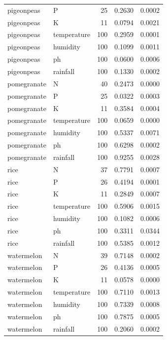 \begin{tabular}{llrrr}
pigeonpeas & P & 25 & 0.2630 & 0.0002 \\
pigeonpeas & K & 11 & 0.0794 & 0.0021 \\
pigeonpeas & temperature & 100 & 0.2959 & 0.0001 \\
pigeonpeas & humidity & 100 & 0.1099 & 0.0011 \\
pigeonpeas & ph & 100 & 0.0600 & 0.0006 \\
pigeonpeas & rainfall & 100 & 0.1330 & 0.0002 \\
pomegranate & N & 40 & 0.2473 & 0.0000 \\
pomegranate & P & 25 & 0.0322 & 0.0003 \\
pomegranate & K & 11 & 0.3584 & 0.0004 \\
pomegranate & temperature & 100 & 0.0659 & 0.0000 \\
pomegranate & humidity & 100 & 0.5337 & 0.0071 \\
pomegranate & ph & 100 & 0.6298 & 0.0002 \\
pomegranate & rainfall & 100 & 0.9255 & 0.0028 \\
rice & N & 37 & 0.7791 & 0.0007 \\
rice & P & 26 & 0.4194 & 0.0001 \\
rice & K & 11 & 0.2849 & 0.0007 \\
rice & temperature & 100 & 0.5906 & 0.0015 \\
rice & humidity & 100 & 0.1082 & 0.0006 \\
rice & ph & 100 & 0.3311 & 0.0344 \\
rice & rainfall & 100 & 0.5385 & 0.0012 \\
watermelon & N & 39 & 0.7148 & 0.0002 \\
watermelon & P & 26 & 0.4136 & 0.0005 \\
watermelon & K & 11 & 0.0578 & 0.0000 \\
watermelon & temperature & 100 & 0.7110 & 0.0013 \\
watermelon & humidity & 100 & 0.7339 & 0.0008 \\
watermelon & ph & 100 & 0.7875 & 0.0005 \\
watermelon & rainfall & 100 & 0.2060 & 0.0002 \\
\bottomrule
\end{tabular}

